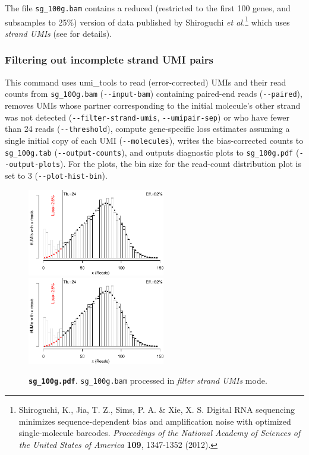 \documentclass[10pt]{article}
\makeatletter
\newcommand{\shellscript}[1]{\bgroup\topsep=0pt\partopsep=0pt\shaded%
	\endshaded\egroup}
\newcommand{\ddarg}[1]{\texttt{-{}-#1}}
\DeclareRobustCommand*{\nameref}[1]{%
      \textit{\my@nameref{#1}}%
    }%
\makeatother
\begin{document}
The file \texttt{sg\_100g.bam} contains a reduced (restricted to the first 100 genes, and subsamples to 25\%) version of data published by Shiroguchi \textit{et al.}\footnote{Shiroguchi, K., Jia, T. Z., Sims, P. A. \& Xie, X. S. Digital RNA sequencing minimizes sequence-dependent bias and amplification noise with optimized single-molecule barcodes. \textit{Proceedings of the National Academy of Sciences of the United States of America} \textbf{109}, 1347-1352 (2012).} which uses \emph{strand UMIs} (see \nameref{strand-umis} for details).

\subsubsection*{Filtering out incomplete strand UMI pairs}

\shellscript{../examples/sg_100g.cmd}

\begin{sloppypar}
This command uses umi\_tools to read (error-corrected) UMIs and their read counts from \texttt{sg\_100g.bam} (\ddarg{input-bam}) containing paired-end reads (\ddarg{paired}), removes UMIs whose partner corresponding to the initial molecule's other strand was not detected (\ddarg{filter-strand-umis}, \ddarg{umipair-sep}) or who have fewer than 24 reads (\ddarg{threshold}), compute gene-specific loss estimates assuming a single initial copy of each UMI (\ddarg{molecules}), writes the bias-corrected counts to \texttt{sg\_100g.tab} (\ddarg{output-counts}), and outputs diagnostic plots to \texttt{sg\_100g.pdf} (\ddarg{output-plots}). For the plots, the bin size for the read-count distribution plot is set to 3 (\ddarg{plot-hist-bin}).
\end{sloppypar}

\begin{figure}[H]
{\centering
\includegraphics[width=6cm,page=1]{../examples/sg_100g.pdf}
\includegraphics[width=6cm,page=2]{../examples/sg_100g.pdf}
\\}
\caption*{\textbf{\texttt{sg\_100g.pdf}}. \texttt{sg\_100g.bam} processed in \emph{filter strand UMIs} mode.}
\end{figure}
\end{document}

